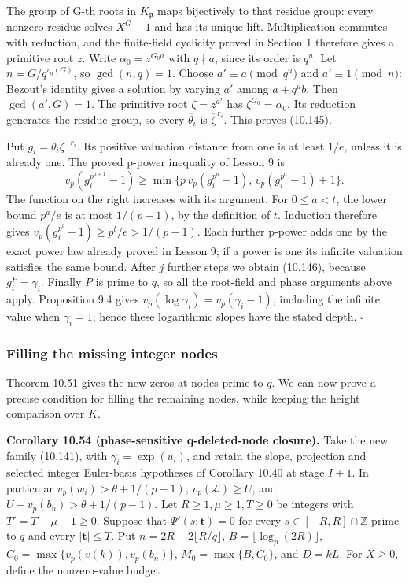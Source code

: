\documentclass[
  11pt,
  a4paper,
]{article}
\begin{document}
The group of G-th roots in \(K_{\mathfrak p}\) maps bijectively to that
residue group: every nonzero residue solves \(X^G-1\) and has its unique
lift. Multiplication commutes with reduction, and the finite-field
cyclicity proved in Section 1 therefore gives a primitive root \(z\).
Write \(\alpha_0=z^{G_0a}\) with \(q\nmid a\), since its order is
\(q^u\). Let \(n=G/q^{v_q(G)}\), so \(\gcd(n,q)=1\). Choose
\(a'\equiv a\pmod{q^u}\) and \(a'\equiv1\pmod n\): Bezout's identity
gives a solution by varying \(a'\) among \(a+q^u b\). Then
\(\gcd(a',G)=1\). The primitive root \(\zeta=z^{a'}\) has
\(\zeta^{G_0}=\alpha_0\). Its reduction generates the residue group, so
every \(\overline{\theta_i}\) is \(\overline\zeta^{\,r_i}\). This proves
(10.145).

Put \(g_i=\theta_i\zeta^{-r_i}\). Its positive valuation distance from
one is at least \(1/e\), unless it is already one. The proved p-power
inequality of Lesson 9 is \[
v_p(g_i^{p^{a+1}}-1)\ge
\min\{p\,v_p(g_i^{p^a}-1),\,v_p(g_i^{p^a}-1)+1\}.
\] The function on the right increases with its argument. For
\(0\le a<t\), the lower bound \(p^a/e\) is at most \(1/(p-1)\), by the
definition of \(t\). Induction therefore gives
\(v_p(g_i^{p^t}-1)\ge p^t/e>1/(p-1)\). Each further p-power adds one by
the exact power law already proved in Lesson 9; if a power is one its
infinite valuation satisfies the same bound. After \(j\) further steps
we obtain (10.146), because \(g_i^P=\gamma_i\). Finally \(P\) is prime
to \(q\), so all the root-field and phase arguments above apply.
Proposition 9.4 gives \(v_p(\log\gamma_i)=v_p(\gamma_i-1)\), including
the infinite value when \(\gamma_i=1\); hence these logarithmic slopes
have the stated depth. \(\square\)

\subsubsection{Filling the missing integer
nodes}\label{filling-the-missing-integer-nodes}

Theorem 10.51 gives the new zeros at nodes prime to \(q\). We can now
prove a precise condition for filling the remaining nodes, while keeping
the height comparison over \(K\).

\textbf{Corollary 10.54 (phase-sensitive q-deleted-node closure).} Take
the new family (10.141), with \(\gamma_i=\exp(u_i)\), and retain the
slope, projection and selected integer Euler-basis hypotheses of
Corollary 10.40 at stage \(I+1\). In particular
\(v_p(w_i)>\theta+1/(p-1)\), \(v_p(\mathcal L)\ge U\), and
\(U-v_p(b_n)>\theta+1/(p-1)\). Let \(R\ge1,\mu\ge1,T\ge0\) be integers
with \(T'=T-\mu+1\ge0\). Suppose that \(\Psi'(s;\boldsymbol t)=0\) for
every \(s\in[-R,R]\cap\mathbb Z\) prime to \(q\) and every
\(|\boldsymbol t|\le T\). Put \(n=2R-2\lfloor R/q\rfloor\),
\(B=\lfloor\log_p(2R)\rfloor\), \(C_0=\max\{v_p(v(k)),v_p(b_n)\}\),
\(M_0=\max\{B,C_0\}\), and \(D=kL\). For \(X\ge0\), define the
nonzero-value budget
\end{document}
